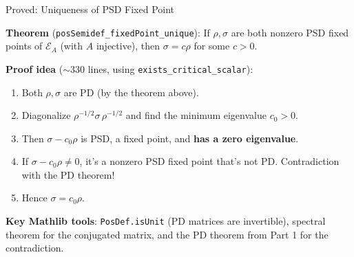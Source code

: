\documentclass[aspectratio=169,10pt]{beamer}
\begin{document}
\begin{frame}{Proved: Uniqueness of PSD Fixed Point}
    \vspace{-0.3em}

    \textbf{Theorem} (\texttt{posSemidef\_fixedPoint\_unique}):
    If $\rho, \sigma$ are both nonzero PSD fixed points of $\mathcal{E}_A$
    (with $A$ injective), then $\sigma = c\rho$ for some $c > 0$.

    \vspace{0.3em}
    \textbf{Proof idea} ($\sim$330 lines, using \texttt{exists\_critical\_scalar}):
    \begin{enumerate}\itemsep0.15em
        \item {\small Both $\rho, \sigma$ are PD (by the theorem above).}
        \item {\small Diagonalize $\rho^{-1/2}\sigma\,\rho^{-1/2}$ and find the minimum eigenvalue $c_0 > 0$.}
        \item {\small Then $\sigma - c_0 \rho$ is PSD, a fixed point, and \textbf{has a zero eigenvalue}.}
        \item {\small If $\sigma - c_0 \rho \neq 0$, it's a nonzero PSD fixed point that's not PD.
            Contradiction with the PD theorem!}
        \item {\small Hence $\sigma = c_0 \rho$.}
    \end{enumerate}

    \vspace{0.3em}
    {\small \textbf{Key Mathlib tools}:
    \texttt{PosDef.isUnit} (PD matrices are invertible),
    spectral theorem for the conjugated matrix,
    and the PD theorem from Part 1 for the contradiction.}
\end{frame}
\end{document}
